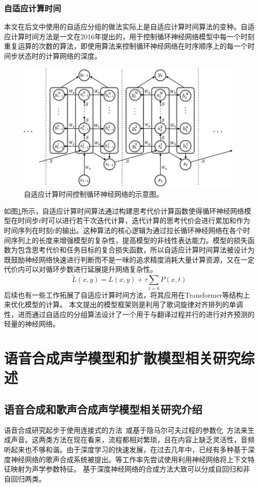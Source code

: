 \subsubsection{自适应计算时间}
本文在后文中使用的自适应分组的做法实际上是自适应计算时间算法的变种。自适应计算时间方法是\citet{act}一文在2016年提出的，用于控制循环神经网络模型中每一个时刻重复运算的次数的算法，即使用算法来控制循环神经网络在时序顺序上的每一个时间步状态时的计算网络的深度。
\begin{figure}[ht]
  \includegraphics[width=0.99\textwidth]{figure/related/act.png}
  \caption{自适应计算时间控制循环神经网络的示意图。}
  \label{fig:act_rnn}
\end{figure}
如图\ref{fig:act_rnn}所示，自适应计算时间算法通过构建思考代价计算函数使得循环神经网络模型在时间步$t$时可以进行若干次迭代计算，迭代计算的思考代价会进行累加和作为时间序列在时刻$t$的输出。这种算法的核心逻辑为通过拉长循环神经网络在各个时间序列上的长度来增强模型的复杂性，提高模型的非线性表达能力。模型的损失函数为包含思考代价和任务目标的复合损失函数，所以自适应计算时间算法被设计为既鼓励神经网络快速进行判断而不是一味的追求精度消耗大量计算资源，又在一定代价内可以对循环步数进行延展提升网络复杂性。
\begin{equation*}
  \tilde{L}(x,y)=L(x,y)+\tau \sum_{t=0} P(x,t)
\end{equation*}
后续也有一些工作拓展了自适应计算时间方法，将其应用在Transformer等结构上来优化模型的计算。
本文提出的模型框架则是利用了歌词旋律对齐排列的单调性，进而通过自适应的分组算法设计了一个用于与翻译过程并行的进行对齐预测的轻量的神经网络。
\section{语音合成声学模型和扩散模型相关研究综述}
\subsection{语音合成和歌声合成声学模型相关研究介绍}
\label{sec:svs_intro}
语音合成研究起步于使用连接式的方法~\citep{macon1997concatenation,kenmochi2007vocaloid}或基于隐马尔可夫过程的参数化~\citep{saino2006hmm,oura2010recent}方法来生成声音。这两类方法在现在看来，流程都相对繁琐，且在内容上缺乏灵活性，音频听起来也不够和谐。由于深度学习的快速发展，在过去几年中，已经有多种基于深度神经网络的歌声合成系统被提出。\citet{nishimura2016singing,blaauw2017neural,kim2018korean,nakamura2019singing,gu2020bytesing}等工作率先尝试使用利用神经网络将上下文特征映射为声学参数特征。
基于深度神经网络的合成方法大致可以分成自回归和非自回归两类。
